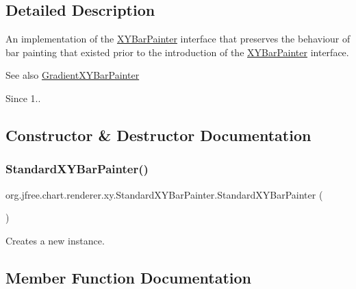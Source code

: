 \subsection{Detailed Description}
An implementation of the \mbox{\hyperlink{interfaceorg_1_1jfree_1_1chart_1_1renderer_1_1xy_1_1_x_y_bar_painter}{X\+Y\+Bar\+Painter}} interface that preserves the behaviour of bar painting that existed prior to the introduction of the \mbox{\hyperlink{interfaceorg_1_1jfree_1_1chart_1_1renderer_1_1xy_1_1_x_y_bar_painter}{X\+Y\+Bar\+Painter}} interface.

\begin{DoxySeeAlso}{See also}
\mbox{\hyperlink{classorg_1_1jfree_1_1chart_1_1renderer_1_1xy_1_1_gradient_x_y_bar_painter}{Gradient\+X\+Y\+Bar\+Painter}}
\end{DoxySeeAlso}
\begin{DoxySince}{Since}
1.. 
\end{DoxySince}


\subsection{Constructor \& Destructor Documentation}
\mbox{\label{classorg_1_1jfree_1_1chart_1_1renderer_1_1xy_1_1_standard_x_y_bar_painter_ac077b66f861173d45580eaf8df7466fb}} 
\subsubsection{\texorpdfstring{Standard\+X\+Y\+Bar\+Painter()}{StandardXYBarPainter()}}
{\footnotesize\ttfamily org.\+jfree.\+chart.\+renderer.\+xy.\+Standard\+X\+Y\+Bar\+Painter.\+Standard\+X\+Y\+Bar\+Painter (\begin{DoxyParamCaption}{ }\end{DoxyParamCaption})}

Creates a new instance. 

\subsection{Member Function Documentation}
\mbox{\label{classorg_1_1jfree_1_1chart_1_1renderer_1_1xy_1_1_standard_x_y_bar_painter_a1149fa1ee2b6b628a59ecf334d2221de}} 

